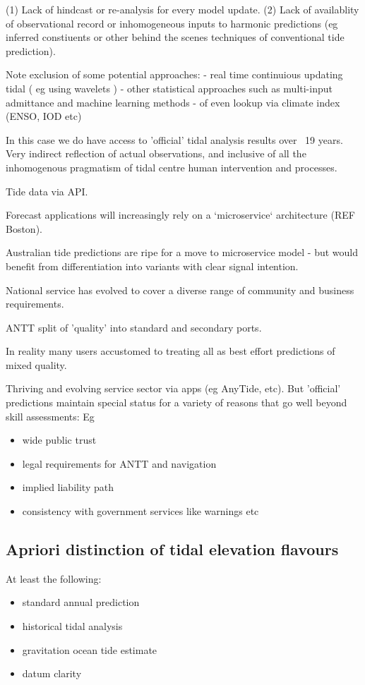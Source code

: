 (1) Lack of hindcast or re-analysis for every model update.
(2) Lack of availablity of observational record or inhomogeneous inputs to harmonic predictions (eg inferred constiuents or other behind the scenes techniques of conventional tide prediction).

Note exclusion of some potential approaches:
- real time continuious updating tidal ( eg using wavelets )
- other statistical approaches such as multi-input admittance and machine learning methods 
- of even lookup via climate index (ENSO, IOD etc)

In this case we do have  access to 'official' tidal analysis results over ~19 years.  
Very indirect reflection of actual observations, and inclusive of all the inhomogenous pragmatism of tidal centre human intervention and processes.


Tide data via API.




Forecast applications will increasingly rely on a `microservice` architecture (REF Boston).

Australian tide predictions are ripe for a move to microservice model - but would benefit from differentiation into variants with clear signal intention.


National service has evolved to cover a diverse range of community and business requirements.

ANTT split of 'quality' into standard and secondary ports.

In reality many users accustomed to treating all as best effort predictions of mixed quality.

Thriving and evolving service sector via apps (eg AnyTide, etc).
But 'official' predictions maintain special status for a variety of reasons that go well beyond skill assessments:
Eg
\begin{itemize}
    \item wide public trust 
    \item legal requirements for ANTT and navigation
    \item implied liability path 
    \item consistency with government services like warnings etc
\end{itemize}


\subsection{Apriori distinction of tidal elevation flavours}
At least the following:
\begin{itemize}
    \item standard annual prediction
    \item historical tidal analysis
    \item gravitation ocean tide estimate
    \item datum clarity
\end{itemize}

